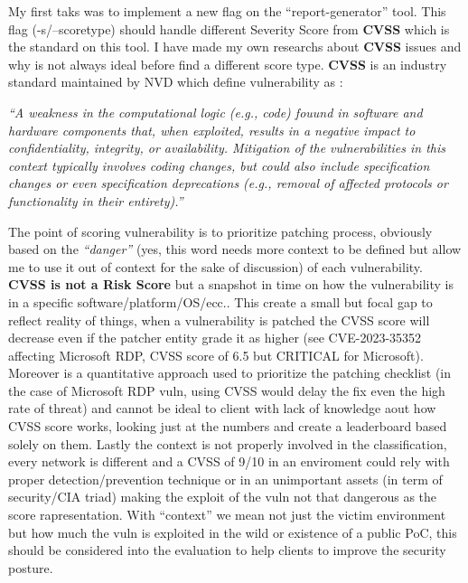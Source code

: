 \documentclass[a4paper]{article}
\begin{document}
My first taks was to implement a new flag on the ``report-generator'' tool. This
flag (-s/--scoretype) should handle different Severity Score from \textbf{CVSS} which is
the standard on this tool. I have made my own researchs about \textbf{CVSS} issues and why
is not always ideal before find a different score type. \textbf{CVSS} is an industry standard
maintained by NVD which define vulnerability as :

\emph{``A weakness in the computational logic (e.g., code)
fouund in software and hardware components that, when exploited, results in a negative impact to confidentiality,
integrity, or availability. Mitigation of the vulnerabilities in this context typically involves coding changes,
but could also include specification changes or even specification deprecations (e.g., removal of affected protocols
or functionality in their entirety).''}

The point of scoring vulnerability is to prioritize patching process, obviously based on the \emph{``danger''} (yes, this
word needs more context to be defined but allow me to use it out of context for the sake of discussion) of each vulnerability.
\textbf{CVSS is not a Risk Score} but a snapshot in time on how the vulnerability is in a specific software/platform/OS/ecc..
This create a small but focal gap to reflect reality of things, when a vulnerability is patched the CVSS score will
decrease even if the patcher entity grade it as higher (see CVE-2023-35352 affecting Microsoft RDP, CVSS score of 6.5
but CRITICAL for Microsoft). Moreover is a quantitative approach used to prioritize the patching checklist (in the case of Microsoft RDP vuln,
using CVSS would delay the fix even the high rate of threat) and cannot be ideal to client with lack of knowledge aout how
CVSS score works, looking just at the numbers and create a leaderboard based solely on them. Lastly the context is not properly involved
in the classification, every network is different and a CVSS of 9/10 in an enviroment could rely with proper detection/prevention technique or
in an unimportant assets (in term of security/CIA triad) making the exploit of the vuln not that dangerous as the score rapresentation.
With ``context'' we mean not just the victim environment but how much the vuln is exploited in the wild or existence of a public PoC,
this should be considered into the evaluation to help clients to improve the security posture.
\end{document}
